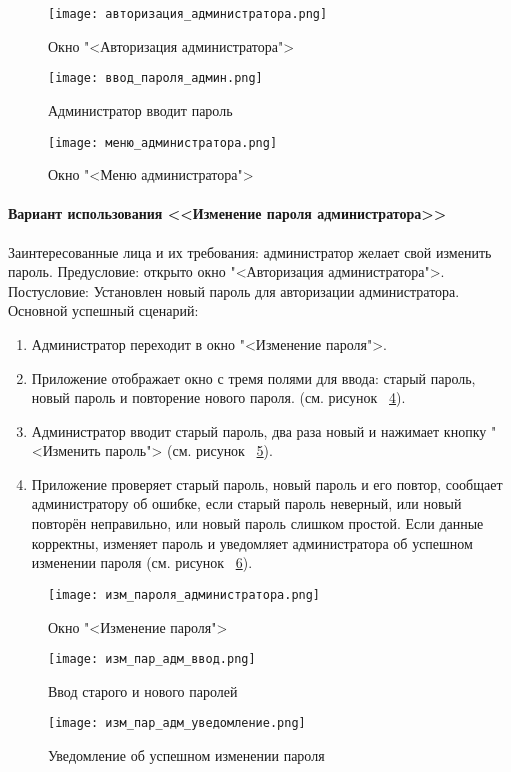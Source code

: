 \begin{figure}[ht]
	\centering
	\texttt{[image: авторизация\_администратора.png]}
	\caption{Окно "<Авторизация администратора">}
	\label{admin_auth_window:image}
\end{figure}
\begin{figure}[H]
	\centering
	\texttt{[image: ввод\_пароля\_админ.png]}
	\caption{Администратор вводит пароль}
	\label{admin_password:image}
\end{figure}
\begin{figure}[H]
	\centering
	\texttt{[image: меню\_администратора.png]}
	\caption{Окно "<Меню администратора">}
	\label{admin_menu_1:image}
\end{figure}

\paragraph{Вариант использования <<Изменение пароля администратора>>}

Заинтересованные лица и их требования: администратор желает свой изменить пароль.
\newline Предусловие: открыто окно "<Авторизация администратора">.
\newline Постусловие: Установлен новый пароль для авторизации администратора.
\newline Основной успешный сценарий:
\begin{enumerate}
	\item Администратор переходит в окно "<Изменение пароля">.
	\item Приложение отображает окно с тремя полями для ввода: старый пароль, новый пароль и повторение нового пароля. (см. рисунок ~\ref{admin_password_ch:image}).
	\item Администратор вводит старый пароль, два раза новый и нажимает кнопку "<Изменить пароль"> (см. рисунок ~\ref{admin_password_input:image}).
	\item Приложение проверяет старый пароль, новый пароль и его повтор, сообщает администратору об ошибке, если старый пароль неверный, или новый повторён неправильно, или новый пароль слишком простой. Если данные корректны, изменяет пароль и уведомляет администратора об успешном изменении пароля (см. рисунок ~\ref{admin_password_notif:image}).
\end{enumerate}

\begin{figure}[H]
	\centering
	\texttt{[image: изм\_пароля\_администратора.png]}
	\caption{Окно "<Изменение пароля">}
	\label{admin_password_ch:image}
\end{figure}
\begin{figure}[H]
	\centering
	\texttt{[image: изм\_пар\_адм\_ввод.png]}
	\caption{Ввод старого и нового паролей}
	\label{admin_password_input:image}
\end{figure}
\begin{figure}[H]
	\centering
	\texttt{[image: изм\_пар\_адм\_уведомление.png]}
	\caption{Уведомление об успешном изменении пароля}
	\label{admin_password_notif:image}
\end{figure}

